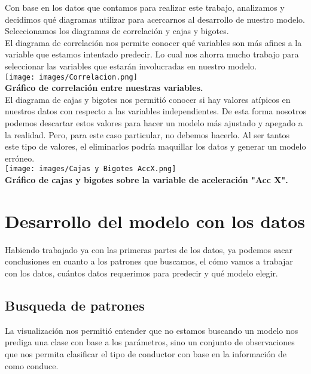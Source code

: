 \documentclass{article}
\begin{document}
        Con base en los datos que contamos para realizar este trabajo, analizamos y decidimos qué diagramas utilizar para acercarnos al desarrollo de nuestro modelo. Seleccionamos los diagramas de correlación y cajas y bigotes. \\
        El diagrama de correlación nos permite conocer qué variables son más afines a la variable que estamos intentado predecir. Lo cual nos ahorra mucho trabajo para seleccionar las variables que estarán involucradas en nuestro modelo. \\

        \texttt{[image: images/Correlacion.png]} \\

        \textbf{Gráfico de correlación entre nuestras variables.} \\
        
        El diagrama de cajas y bigotes nos permitió conocer si hay valores atípicos en nuestros datos con respecto a las variables independientes. De esta forma nosotros podemos descartar estos valores para hacer un modelo más ajustado y apegado a la realidad. Pero, para este caso particular, no debemos hacerlo. Al ser tantos este tipo de valores, el eliminarlos podría maquillar los datos y generar un modelo erróneo.\\

        \texttt{[image: images/Cajas y Bigotes AccX.png]} \\

        \textbf{Gráfico de cajas y bigotes sobre la variable de aceleración "Acc X".} \\

\section{Desarrollo del modelo con los datos}

Habiendo trabajado ya con las primeras partes de los datos, ya podemos sacar conclusiones en cuanto a los patrones que buscamos, el cómo vamos a trabajar con los datos, cuántos datos requerimos para predecir y qué modelo elegir. \\
        
    \subsection{Busqueda de patrones}

        La visualización nos permitió entender que no estamos buscando un modelo nos prediga una clase con base a los parámetros, sino un conjunto de observaciones que nos permita clasificar el tipo de conductor con base en la información de como conduce. 
        
\end{document}
